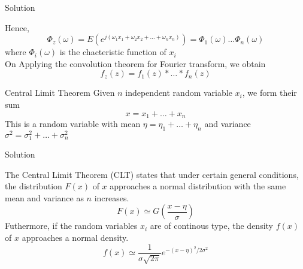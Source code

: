 \documentclass{beamer}
\begin{document}
    \begin{frame}{Solution}
        \begin{alertblock}{}
        Hence,
        \begin{equation}
            \Phi_z(\omega) = E(e^{j(\omega_1x_1+\omega_2x_2+\ldots+\omega_n x_n)}) = \Phi_1(\omega)\ldots \Phi_n(\omega)
        \end{equation}
        where $\Phi_i(\omega)$ is the chacteristic function of $x_i$\\
        On Applying the convolution theorem for Fourier transform, we obtain
        \begin{equation}
            f_z(z) = f_1(z)*\ldots*f_n(z)
        \end{equation}
    \end{alertblock}
    \begin{alertblock}{Central Limit Theorem}
        Given $n$ independent random variable $x_i$, we form their sum
        \begin{equation}
            x=x_1+\ldots+x_n
        \end{equation}
        This is a random variable with mean $\eta = \eta_1+\ldots+\eta_n$ and variance $\sigma^2=\sigma_1^2+\ldots+\sigma_n^2$
    \end{alertblock}
\end{frame}
\begin{frame}{Solution}
    \begin{alertblock}{}
        The Central Limit Theorem (CLT) states that under certain general conditions, the distribution $F(x)$ of $x$ approaches a normal distribution with the same mean and variance as $n$ increases.
        \begin{equation}
            F(x) \simeq G\left(\frac{x-\eta}{\sigma}\right)
        \end{equation}
        Futhermore, if the random variables $x_i$ are of continous type, the density $f(x)$ of $x$ approaches a normal density.
        \begin{equation}
            f(x) \simeq \frac{1}{\sigma\sqrt{2\pi}}e^{-(x-\eta)^2/2\sigma^2}
        \end{equation}
    \end{alertblock}
\end{frame}
\end{document}
